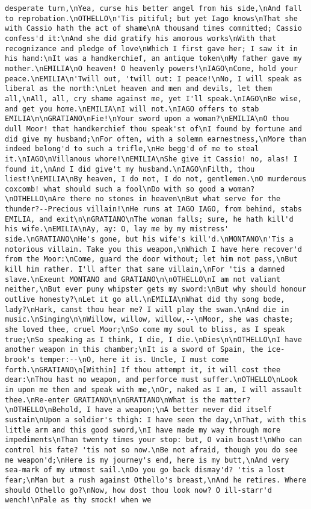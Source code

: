 \begin{verbatim}
desperate turn,\nYea, curse his better angel from his side,\nAnd fall to reprobation.\nOTHELLO\n'Tis pitiful; but yet Iago knows\nThat she with Cassio hath the act of shame\nA thousand times committed; Cassio confess'd it:\nAnd she did gratify his amorous works\nWith that recognizance and pledge of love\nWhich I first gave her; I saw it in his hand:\nIt was a handkerchief, an antique token\nMy father gave my mother.\nEMILIA\nO heaven! O heavenly powers!\nIAGO\nCome, hold your peace.\nEMILIA\n'Twill out, 'twill out: I peace!\nNo, I will speak as liberal as the north:\nLet heaven and men and devils, let them all,\nAll, all, cry shame against me, yet I'll speak.\nIAGO\nBe wise, and get you home.\nEMILIA\nI will not.\nIAGO offers to stab EMILIA\n\nGRATIANO\nFie!\nYour sword upon a woman?\nEMILIA\nO thou dull Moor! that handkerchief thou speak'st of\nI found by fortune and did give my husband;\nFor often, with a solemn earnestness,\nMore than indeed belong'd to such a trifle,\nHe begg'd of me to steal it.\nIAGO\nVillanous whore!\nEMILIA\nShe give it Cassio! no, alas! I found it,\nAnd I did give't my husband.\nIAGO\nFilth, thou liest!\nEMILIA\nBy heaven, I do not, I do not, gentlemen.\nO murderous coxcomb! what should such a fool\nDo with so good a woman?\nOTHELLO\nAre there no stones in heaven\nBut what serve for the thunder?--Precious villain!\nHe runs at IAGO IAGO, from behind, stabs EMILIA, and exit\n\nGRATIANO\nThe woman falls; sure, he hath kill'd his wife.\nEMILIA\nAy, ay: O, lay me by my mistress' side.\nGRATIANO\nHe's gone, but his wife's kill'd.\nMONTANO\n'Tis a notorious villain. Take you this weapon,\nWhich I have here recover'd from the Moor:\nCome, guard the door without; let him not pass,\nBut kill him rather. I'll after that same villain,\nFor 'tis a damned slave.\nExeunt MONTANO and GRATIANO\n\nOTHELLO\nI am not valiant neither,\nBut ever puny whipster gets my sword:\nBut why should honour outlive honesty?\nLet it go all.\nEMILIA\nWhat did thy song bode, lady?\nHark, canst thou hear me? I will play the swan.\nAnd die in music.\nSinging\n\nWillow, willow, willow,--\nMoor, she was chaste; she loved thee, cruel Moor;\nSo come my soul to bliss, as I speak true;\nSo speaking as I think, I die, I die.\nDies\n\nOTHELLO\nI have another weapon in this chamber;\nIt is a sword of Spain, the ice-brook's temper:--\nO, here it is. Uncle, I must come forth.\nGRATIANO\n[Within] If thou attempt it, it will cost thee dear:\nThou hast no weapon, and perforce must suffer.\nOTHELLO\nLook in upon me then and speak with me,\nOr, naked as I am, I will assault thee.\nRe-enter GRATIANO\n\nGRATIANO\nWhat is the matter?\nOTHELLO\nBehold, I have a weapon;\nA better never did itself sustain\nUpon a soldier's thigh: I have seen the day,\nThat, with this little arm and this good sword,\nI have made my way through more impediments\nThan twenty times your stop: but, O vain boast!\nWho can control his fate? 'tis not so now.\nBe not afraid, though you do see me weapon'd;\nHere is my journey's end, here is my butt,\nAnd very sea-mark of my utmost sail.\nDo you go back dismay'd? 'tis a lost fear;\nMan but a rush against Othello's breast,\nAnd he retires. Where should Othello go?\nNow, how dost thou look now? O ill-starr'd wench!\nPale as thy smock! when we 
\end{verbatim}
